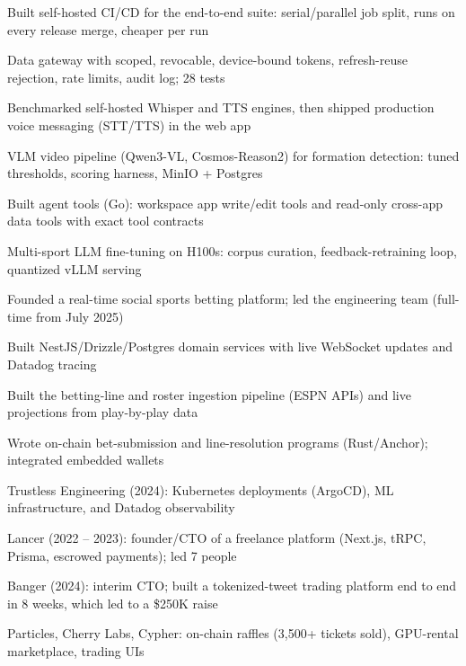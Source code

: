 \documentclass[print]{jack-resume}
\begin{document}
\begin{tightemize}
    \item Built self-hosted CI/CD for the end-to-end suite: serial/parallel job split, runs on every release merge, cheaper per run
    \item Data gateway with scoped, revocable, device-bound tokens, refresh-reuse rejection, rate limits, audit log; 28 tests
    \item Benchmarked self-hosted Whisper and TTS engines, then shipped production voice messaging (STT/TTS) in the web app
    \item VLM video pipeline (Qwen3-VL, Cosmos-Reason2) for formation detection: tuned thresholds, scoring harness, MinIO + Postgres
    \item Built agent tools (Go): workspace app write/edit tools and read-only cross-app data tools with exact tool contracts
    \item Multi-sport LLM fine-tuning on H100s: corpus curation, feedback-retraining loop, quantized vLLM serving
\end{tightemize}
\sectionsep

\begin{tightemize}
    \item Founded a real-time social sports betting platform; led the engineering team (full-time from July 2025)
    \item Built NestJS/Drizzle/Postgres domain services with live WebSocket updates and Datadog tracing
    \item Built the betting-line and roster ingestion pipeline (ESPN APIs) and live projections from play-by-play data
    \item Wrote on-chain bet-submission and line-resolution programs (Rust/Anchor); integrated embedded wallets
\end{tightemize}
\sectionsep

\begin{tightemize}
    \item Trustless Engineering (2024): Kubernetes deployments (ArgoCD), ML infrastructure, and Datadog observability
    \item Lancer (2022 – 2023): founder/CTO of a freelance platform (Next.js, tRPC, Prisma, escrowed payments); led 7 people
    \item Banger (2024): interim CTO; built a tokenized-tweet trading platform end to end in 8 weeks, which led to a \$250K raise
    \item Particles, Cherry Labs, Cypher: on-chain raffles (3,500+ tickets sold), GPU-rental marketplace, trading UIs
\end{tightemize}
\sectionsep
\end{document}
